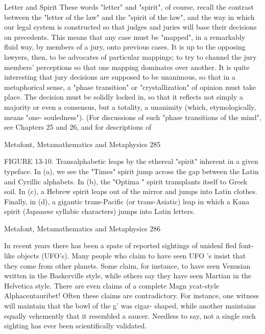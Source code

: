                                    Letter and Spirit
        These words "letter" and "spirit", of course, recall the contrast between the "letter
of the law" and the "spirit of the law", and the way in which our legal system is
constructed so that judges and juries will base their decisions on precedents. This means
that any case must be "mapped", in a remarkably fluid way, by members of a jury, onto
previous cases. It is up to the opposing lawyers, then, to be advocates of particular
mappings; to try to channel the jury members' perceptions so that one mapping dominates
over another. It is quite interesting that jury decisions are supposed to be unanimous, so
that in a metaphorical sense, a "phase transition" or "crystallization" of opinion must take
place. The decision must be solidly locked in, so that it reflects not simply a majority or
even a consensus, but a totality, a unanimity (which, etymologically, means "one-
souledness"). (For discussions of such "phase transitions of the mind", see Chapters 25
and 26, and for descriptions of




Metafont, Metamathematics and Metaphysics                                                285

FIGURE 13-10. Transalphabetic leaps by the ethereal "spirit" inherent in a given
typeface. In (a), we see the "Times" spirit jump across the gap between the Latin and
Cyrillic alphabets. In (b), the "Optima " spirit transplants itself to Greek soil. In (c), a
Hebrew spirit leaps out of the mirror and jumps into Latin clothes. Finally, in (d), a
gigantic trans-Pacific (or trans-Asiatic) leap in which a Kana spirit (Japanese syllabic
characters) jumps into Latin letters.


Metafont, Metamathematics and Metaphysics                                                  286

        In recent years there has been a spate of reported sightings of unidenl fled font-
like objects (UFO's). Many people who claim to have seen UFO 's insist that they come
from other planets. Some claim, for instance, to have seen Venusian written in the
Baskerville style, while others say they have seen Martian in the Helvetica style. There
are even claims of a complete Magn ycat-style Alphacentauribet! Often these claims are
contradictory. For instance, one witness will maintain that the bowl of the g' was cigar-
shaped, while another maintains equally vehemently that it resembled a saucer. Needless
to say, not a single such sighting has ever been scientifically validated.


